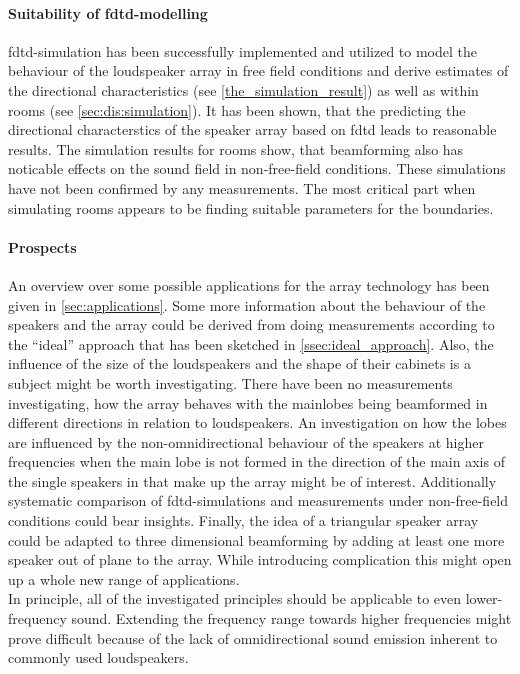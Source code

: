 \paragraph{Suitability of \gls{fdtd}-modelling}
\gls{fdtd}-simulation has been successfully implemented and utilized to model the behaviour of the loudspeaker array in free field conditions and derive estimates of the directional characteristics (see \autoref{the_simulation_result}) as well as within rooms (see \autoref{sec:dis:simulation}). It has been shown, that the predicting the directional characterstics of the speaker array based on \gls{fdtd} leads to reasonable results. The simulation results for rooms show, that beamforming also has noticable effects on the sound field in non-free-field conditions. These simulations have not been confirmed by any measurements. The most critical part when simulating rooms appears to be finding suitable parameters for the boundaries.
\paragraph{Prospects}
An overview over some possible applications for the array technology has been given in \autoref{sec:applications}. Some more information about the behaviour of the speakers and the array could be derived from doing measurements according to the ``ideal'' approach that has been sketched in \autoref{ssec:ideal_approach}. Also, the influence of the size of the loudspeakers and the shape of their cabinets is a subject might be worth investigating. There have been no measurements investigating, how the array behaves with the mainlobes being beamformed in different directions in relation to loudspeakers. An investigation on how the lobes are influenced by the non-omnidirectional behaviour of the speakers at higher frequencies when the main lobe is not formed in the direction of the main axis of the single speakers in that make up the array might be of interest. Additionally systematic comparison of \gls{fdtd}-simulations and measurements under non-free-field conditions could bear insights.
Finally, the idea of a triangular speaker array could be adapted to three dimensional beamforming by adding at least one more speaker out of plane to the array. While introducing complication this might open up a whole new range of applications.\\
In principle, all of the investigated principles should be applicable to even lower-frequency sound. Extending the frequency range towards higher frequencies might prove difficult because of the lack of omnidirectional sound emission inherent to commonly used loudspeakers.
